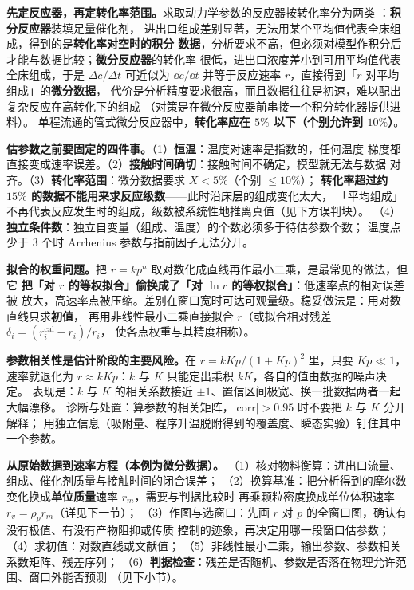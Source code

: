\textbf{先定反应器，再定转化率范围。}求取动力学参数的反应器按转化率分为两类
：\textbf{积分反应器}装填足量催化剂，
进出口组成差别显著，无法用某个平均值代表全床组成，得到的是\textbf{转化率对空时的积分
数据}，分析要求不高，但必须对模型作积分后才能与数据比较；\textbf{微分反应器}的转化率
很低，进出口浓度差小到可用平均值代表全床组成，于是 $\Delta c/\Delta t$ 可近似为
$\dd c/\dd t$ 并等于反应速率 $r$，直接得到「$r$ 对平均组成」的\textbf{微分数据}，
代价是分析精度要求很高，而且数据往往是初速，难以配出复杂反应在高转化下的组成
（对策是在微分反应器前串接一个积分转化器提供进料）。
单程流通的管式微分反应器中，\textbf{转化率应在 $5\%$ 以下（个别允许到 $10\%$）}。

\begin{measure}
\textbf{估参数之前要固定的四件事。}（1）\textbf{恒温}：温度对速率是指数的，任何温度
梯度都直接变成速率误差。（2）\textbf{接触时间确切}：接触时间不确定，模型就无法与数据
对齐。（3）\textbf{转化率范围}：微分数据要求 $X<5\%$（个别 $\le10\%$）；
\textbf{转化率超过约 $15\%$ 的数据不能用来求反应级数}——此时沿床层的组成变化太大，
「平均组成」不再代表反应发生时的组成，级数被系统性地推离真值（见下方误判块）。
（4）\textbf{独立条件数}：独立自变量（组成、温度）的个数必须多于待估参数个数；
温度点少于 $3$ 个时 Arrhenius 参数与指前因子无法分开。
\end{measure}

\textbf{拟合的权重问题。}把 $r=kp^n$ 取对数化成直线再作最小二乘，是最常见的做法，但它
\textbf{把「对 $r$ 的等权拟合」偷换成了「对 $\ln r$ 的等权拟合」}：低速率点的相对误差被
放大，高速率点被压缩。差别在窗口宽时可达可观量级。稳妥做法是：用对数直线只求\textbf{初值}，
再用非线性最小二乘直接拟合 $r$（或拟合相对残差 $\delta_i=(r_i^{\mathrm{cal}}-r_i)/r_i$，
使各点权重与其精度相称）。

\textbf{参数相关性是估计阶段的主要风险。}在 $r=kKp/(1+Kp)^2$ 里，只要 $Kp\ll1$，
速率就退化为 $r\approx kKp$：$k$ 与 $K$ 只能定出乘积 $kK$，各自的值由数据的噪声决定。
表现是：$k$ 与 $K$ 的相关系数接近 $\pm1$、置信区间极宽、换一批数据两者一起大幅漂移。
诊断与处置：算参数的相关矩阵，$|\mathrm{corr}|>0.95$ 时不要把 $k$ 与 $K$ 分开解释；
用独立信息（吸附量、程序升温脱附得到的覆盖度、瞬态实验）钉住其中一个参数。

\begin{dataflow}
\textbf{从原始数据到速率方程（本例为微分数据）。}
（1）核对物料衡算：进出口流量、组成、催化剂质量与接触时间的闭合误差；
（2）换算基准：把分析得到的摩尔数变化换成\textbf{单位质量}速率 $r_m$，需要与判据比较时
再乘颗粒密度换成单位体积速率 $r_v=\rho_pr_m$（详见下一节）；
（3）作图与选窗口：先画 $r$ 对 $p$ 的全窗口图，确认有没有极值、有没有产物阻抑或传质
控制的迹象，再决定用哪一段窗口估参数；
（4）求初值：对数直线或文献值；
（5）非线性最小二乘，输出参数、参数相关系数矩阵、残差序列；
（6）\textbf{判据检查}：残差是否随机、参数是否落在物理允许范围、窗口外能否预测
（见下小节）。
\end{dataflow}

